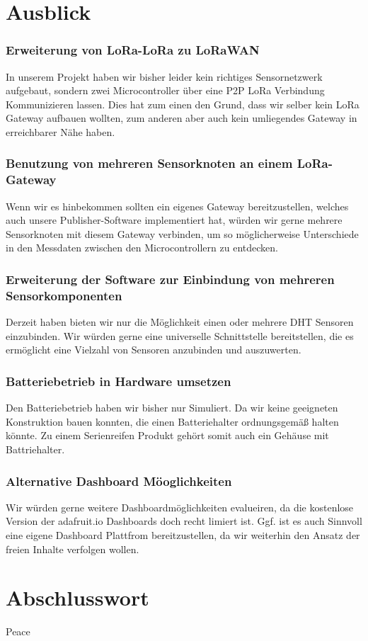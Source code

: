 \section{Ausblick} \label{Ausblick}

\subsubsection{Erweiterung von LoRa-LoRa zu LoRaWAN}
In unserem Projekt haben wir bisher leider kein richtiges Sensornetzwerk aufgebaut, sondern zwei Microcontroller über eine P2P LoRa Verbindung Kommunizieren lassen. Dies hat zum einen den Grund, dass wir selber kein LoRa Gateway aufbauen wollten, zum anderen aber auch kein umliegendes Gateway in erreichbarer Nähe haben.

\subsubsection{Benutzung von mehreren Sensorknoten an einem LoRa-Gateway}
Wenn wir es hinbekommen sollten ein eigenes Gateway bereitzustellen, welches auch unsere Publisher-Software implementiert hat, würden wir gerne mehrere Sensorknoten mit diesem Gateway verbinden, um so möglicherweise Unterschiede in den Messdaten zwischen den Microcontrollern zu entdecken.

\subsubsection{Erweiterung der Software zur Einbindung von mehreren Sensorkomponenten}
Derzeit haben bieten wir nur die Möglichkeit einen oder mehrere DHT Sensoren einzubinden. Wir würden gerne eine universelle Schnittstelle bereitstellen, die es ermöglicht eine Vielzahl von Sensoren anzubinden und auszuwerten.

\subsubsection{Batteriebetrieb in Hardware umsetzen}
Den Batteriebetrieb haben wir bisher nur Simuliert. Da wir keine geeigneten Konstruktion bauen konnten, die einen Batteriehalter ordnungsgemäß halten könnte. Zu einem Serienreifen Produkt gehört somit auch ein Gehäuse mit Battriehalter.

\subsubsection{Alternative Dashboard Möoglichkeiten}
Wir würden gerne weitere Dashboardmöglichkeiten evalueiren, da die kostenlose Version der adafruit.io Dashboards doch recht limiert ist. Ggf. ist es auch Sinnvoll eine eigene Dashboard Plattfrom bereitzustellen, da wir weiterhin den Ansatz der freien Inhalte verfolgen wollen.

\section{Abschlusswort} \label{Abschlusswort}

Peace

